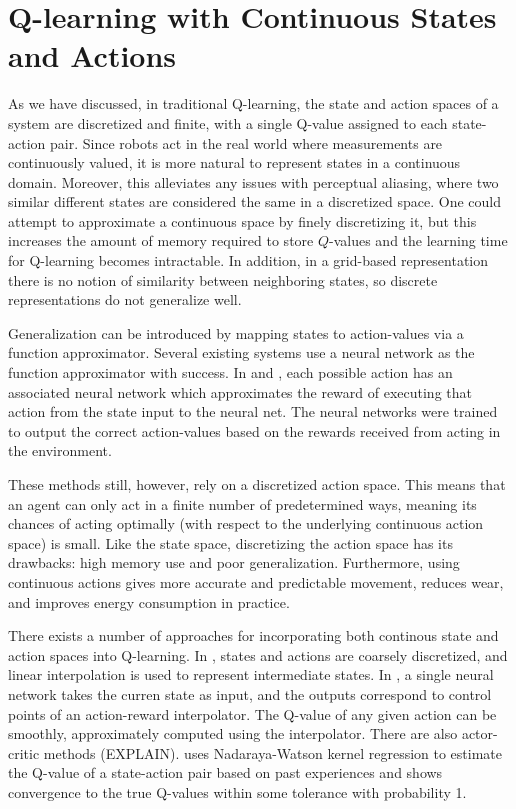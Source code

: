 \documentclass{article} %
\begin{document}
\section{Q-learning with Continuous States and Actions}
As we have discussed, in traditional Q-learning, the state and action spaces of a system are discretized and finite, with a single Q-value assigned to each state-action pair.  Since robots act in the real world where measurements are continuously valued, it is more natural to represent states in a continuous domain.  Moreover, this alleviates any issues with perceptual aliasing, where two similar different states are considered the same in a discretized space.  One could attempt to approximate a continuous space by finely discretizing it, but this increases the amount of memory required to store $Q$-values and the learning time for Q-learning becomes intractable.  In addition, in a grid-based representation there is no notion of similarity between neighboring states, so discrete representations do not generalize well.  

Generalization can be introduced by mapping states to action-values via a function approximator.  Several existing systems use a neural network as the function approximator \cite{lin} \cite{deep_rl} \cite{gaskett_thesis} with success. In \cite{lin} and \cite{deep_rl}, each possible action has an associated neural network which approximates the reward of executing that action from the state input to the neural net.  The neural networks were trained to output the correct action-values based on the rewards received from acting in the environment.  

These methods still, however, rely on a discretized action space.  This means that an agent can only act in a finite number of predetermined ways, meaning its chances of acting optimally (with respect to the underlying continuous action space) is small.  Like the state space, discretizing the action space has its drawbacks: high memory use and poor generalization.  Furthermore, using continuous actions gives more accurate and predictable movement, reduces wear, and improves energy consumption in practice\cite{gaskett_thesis}. 

There exists a number of approaches for incorporating both continous state and action spaces into Q-learning.  In \cite{takahashi}, states and actions are coarsely discretized, and linear interpolation is used to represent intermediate states.  In \cite{gaskett_thesis}, a single neural network takes the curren state as input, and the outputs correspond to control points of an action-reward interpolator.  The Q-value of any given action can be smoothly, approximately computed using the interpolator. There are also actor-critic methods (EXPLAIN).  \cite{carden2014} uses Nadaraya-Watson kernel regression \cite{nadaraya} to estimate the Q-value of a state-action pair based on past experiences and shows convergence to the true Q-values within some tolerance with probability 1.  
\end{document}
